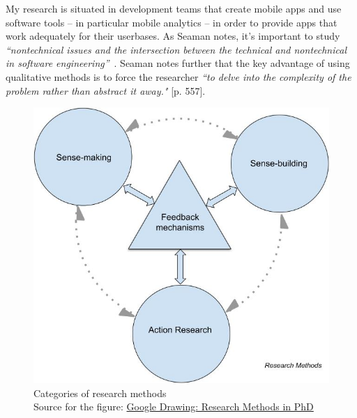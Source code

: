 My research is situated in development teams that create mobile apps and use software tools -- in particular mobile analytics -- in order to provide apps that work adequately for their userbases. As Seaman notes, it's important to study \emph{``nontechnical issues and the intersection between the technical and nontechnical in software engineering''}~. Seaman notes further that the key advantage of using qualitative methods is to force the researcher \emph{``to delve into the complexity of the problem rather than abstract it away."} [p. 557].

\begin{figure}
    \centering
    \includegraphics{images/my/categories-of-research-methods-02-aug-2022.jpeg}
    \caption{Categories of research methods \\Source for the figure: {\footnotesize \href{https://docs.google.com/drawings/d/1DpnrvH1ajAKtmcpbJjTWEshdQG_nAIfDS_eAL8obSAQ/edit?usp=sharing}{Google Drawing: Research Methods in PhD}}}
    \label{fig:categories-of-research-methods}
\end{figure}


